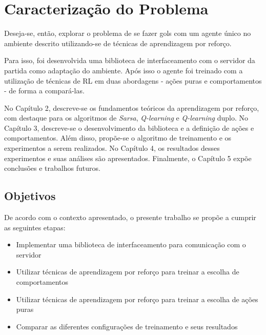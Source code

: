 \section{Caracterização do Problema}
\par Deseja-se, então, explorar o problema de se fazer gols com um agente único no ambiente descrito utilizando-se de técnicas de aprendizagem por reforço.
\par Para isso, foi desenvolvida uma biblioteca de interfaceamento com o servidor da partida como adaptação do ambiente. Após isso o agente foi treinado com a utilização de técnicas de RL em duas abordagens - ações puras e comportamentos - de forma a compará-las.
\par No Capítulo 2, descreve-se os fundamentos teóricos da aprendizagem por reforço, com destaque para os algoritmos de \textit{Sarsa}, \textit{Q-learning} e \textit{Q-learning} duplo. No Capítulo 3, descreve-se o desenvolvimento da biblioteca e a definição de ações e comportamentos. Além disso, propõe-se o algoritmo de treinamento e os experimentos a serem realizados. No Capítulo 4, os resultados desses experimentos e suas análises são apresentados. Finalmente, o Capítulo 5 expõe conclusões e trabalhos futuros.

\subsection{Objetivos}
\par De acordo com o contexto apresentado, o presente trabalho se propõe a cumprir as seguintes etapas:
\begin{itemize}
	\item Implementar uma biblioteca de interfaceamento para comunicação com o servidor
	\item Utilizar técnicas de aprendizagem por reforço para treinar a escolha de comportamentos
	\item Utilizar técnicas de aprendizagem por reforço para treinar a escolha de ações puras
	\item Comparar as diferentes configurações de treinamento e seus resultados
\end{itemize}

